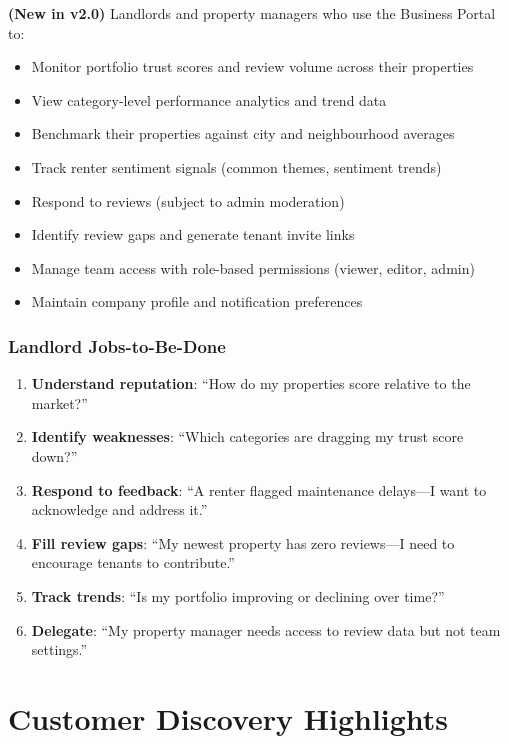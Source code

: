 \documentclass[11pt,letterpaper]{article}
\begin{document}
\textbf{(New in v2.0)} Landlords and property managers who use the Business Portal to:
\begin{itemize}
    \item Monitor portfolio trust scores and review volume across their properties
    \item View category-level performance analytics and trend data
    \item Benchmark their properties against city and neighbourhood averages
    \item Track renter sentiment signals (common themes, sentiment trends)
    \item Respond to reviews (subject to admin moderation)
    \item Identify review gaps and generate tenant invite links
    \item Manage team access with role-based permissions (viewer, editor, admin)
    \item Maintain company profile and notification preferences
\end{itemize}

\subsubsection{Landlord Jobs-to-Be-Done}

\begin{enumerate}
    \item \textbf{Understand reputation}: ``How do my properties score relative to the market?''
    \item \textbf{Identify weaknesses}: ``Which categories are dragging my trust score down?''
    \item \textbf{Respond to feedback}: ``A renter flagged maintenance delays---I want to acknowledge and address it.''
    \item \textbf{Fill review gaps}: ``My newest property has zero reviews---I need to encourage tenants to contribute.''
    \item \textbf{Track trends}: ``Is my portfolio improving or declining over time?''
    \item \textbf{Delegate}: ``My property manager needs access to review data but not team settings.''
\end{enumerate}

\section{Customer Discovery Highlights}
\end{document}
